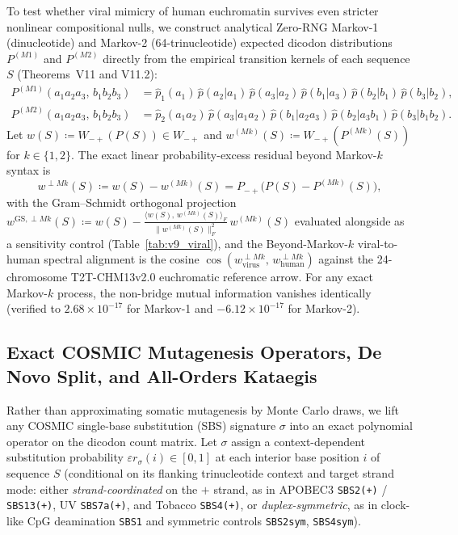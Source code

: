 \documentclass[11pt, a4paper]{article}
\DeclareRobustCommand{\_}{\textunderscore\allowbreak}
\begin{document}
To test whether viral mimicry of human euchromatin survives even stricter nonlinear compositional nulls, we construct analytical Zero-RNG Markov-1 (dinucleotide) and Markov-2 (64-trinucleotide) expected dicodon distributions $P^{(M1)}$ and $P^{(M2)}$ directly from the empirical transition kernels of each sequence $S$ (Theorems~V11 and V11.2):
\begin{align}
    P^{(M1)}(a_1 a_2 a_3,\, b_1 b_2 b_3) &= \hat{p}_1(a_1)\,\hat{p}(a_2|a_1)\,\hat{p}(a_3|a_2)\,\hat{p}(b_1|a_3)\,\hat{p}(b_2|b_1)\,\hat{p}(b_3|b_2), \\
    P^{(M2)}(a_1 a_2 a_3,\, b_1 b_2 b_3) &= \hat{p}_2(a_1 a_2)\,\hat{p}(a_3|a_1 a_2)\,\hat{p}(b_1|a_2 a_3)\,\hat{p}(b_2|a_3 b_1)\,\hat{p}(b_3|b_1 b_2).
\end{align}
Let $w(S) \coloneqq W_{-+}(P(S)) \in W_{-+}$ and $w^{(Mk)}(S) \coloneqq W_{-+}(P^{(Mk)}(S))$ for $k \in \{1, 2\}$. The exact linear probability-excess residual beyond Markov-$k$ syntax is
\begin{equation}
    w^{\perp Mk}(S) \coloneqq w(S) - w^{(Mk)}(S) = P_{-+}\bigl(P(S) - P^{(Mk)}(S)\bigr),
\end{equation}
with the Gram--Schmidt orthogonal projection $w^{\mathrm{GS},\perp Mk}(S) \coloneqq w(S) - \frac{\langle w(S),\, w^{(Mk)}(S) \rangle_F}{\|w^{(Mk)}(S)\|_F^2}\, w^{(Mk)}(S)$ evaluated alongside as a sensitivity control (Table~\ref{tab:v9_viral}), and the Beyond-Markov-$k$ viral-to-human spectral alignment is the cosine $\cos(w^{\perp Mk}_{\mathrm{virus}},\, w^{\perp Mk}_{\mathrm{human}})$ against the 24-chromosome T2T-CHM13v2.0 euchromatic reference arrow. For any exact Markov-$k$ process, the non-bridge mutual information vanishes identically (verified to $2.68 \times 10^{-17}$ for Markov-1 and $-6.12 \times 10^{-17}$ for Markov-2).

\subsection{Exact COSMIC Mutagenesis Operators, De Novo Split, and All-Orders Kataegis}

Rather than approximating somatic mutagenesis by Monte Carlo draws, we lift any COSMIC single-base substitution (SBS) signature $\sigma$ into an exact polynomial operator on the dicodon count matrix. Let $\sigma$ assign a context-dependent substitution probability $\varepsilon r_\sigma(i) \in [0, 1]$ at each interior base position $i$ of sequence $S$ (conditional on its flanking trinucleotide context and target strand mode: either \emph{strand-coordinated} on the $+$ strand, as in APOBEC3 \texttt{SBS2(+)} / \texttt{SBS13(+)}, UV \texttt{SBS7a(+)}, and Tobacco \texttt{SBS4(+)}, or \emph{duplex-symmetric}, as in clock-like CpG deamination \texttt{SBS1} and symmetric controls \texttt{SBS2\_sym}, \texttt{SBS4\_sym}).
\end{document}
